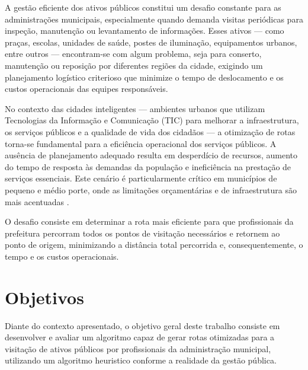 A gestão eficiente dos ativos públicos constitui um desafio constante para as administrações municipais, 
especialmente quando demanda visitas periódicas para inspeção, manutenção ou levantamento de informações. 
Esses ativos — como praças, escolas, unidades de saúde, postes de iluminação, equipamentos urbanos, entre outros — 
encontram-se com algum problema, seja para conserto, manutenção ou reposição por diferentes regiões da cidade, exigindo um planejamento logístico criterioso que minimize 
o tempo de deslocamento e os custos operacionais das equipes responsáveis.

No contexto das cidades inteligentes — ambientes urbanos que utilizam Tecnologias da Informação e 
Comunicação (TIC) para melhorar a infraestrutura, os serviços públicos e a qualidade de vida dos 
cidadãos \cite{WEISS2015} — a otimização de rotas torna-se fundamental para a eficiência 
operacional dos serviços públicos. A ausência de planejamento adequado resulta em desperdício de recursos, 
aumento do tempo de resposta às demandas da população e ineficiência na prestação de serviços essenciais. 
Este cenário é particularmente crítico em municípios de pequeno e médio porte, onde as limitações orçamentárias 
e de infraestrutura são mais acentuadas \cite{SANTIAGO2023}.

O desafio consiste em determinar a rota mais eficiente para que 
profissionais da prefeitura percorram todos os pontos de visitação necessários e retornem ao ponto de origem, 
minimizando a distância total percorrida e, consequentemente, o tempo e os custos operacionais.

\section{Objetivos}


Diante do contexto apresentado, o objetivo geral deste trabalho consiste em desenvolver e avaliar um algoritmo 
capaz de gerar rotas otimizadas para a visitação de ativos públicos por profissionais da administração municipal, 
utilizando um algoritmo heuristico conforme a realidade da gestão pública.

